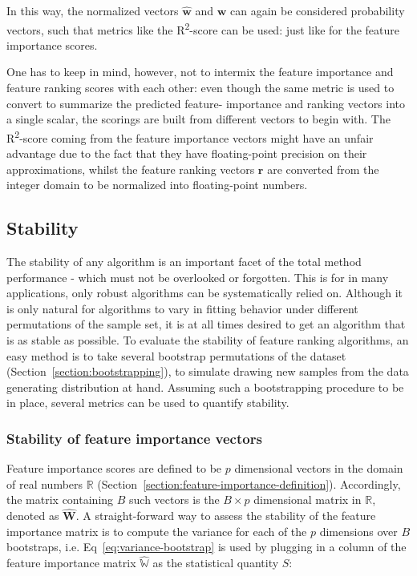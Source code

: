 \documentclass{article}
\begin{document}
In this way, the normalized vectors $\hat{\boldsymbol{w}}$ and $\boldsymbol{w}$ can again be considered probability vectors, such that metrics like the R\textsuperscript{2}-score can be used: just like for the feature importance scores.

One has to keep in mind, however, not to intermix the feature importance and feature ranking scores with each other: even though the same metric is used to convert to summarize the predicted feature- importance and ranking vectors into a single scalar, the scorings are built from different vectors to begin with. The R\textsuperscript{2}-score coming from the feature importance vectors might have an unfair advantage due to the fact that they have floating-point precision on their approximations, whilst the feature ranking vectors $\boldsymbol{r}$ are converted from the integer domain to be normalized into floating-point numbers.

\subsection{Stability}
The stability of any algorithm is an important facet of the total method performance - which must not be overlooked or forgotten. This is for in many applications, only robust algorithms can be systematically relied on. Although it is only natural for algorithms to vary in fitting behavior under different permutations of the sample set, it is at all times desired to get an algorithm that is as stable as possible. To evaluate the stability of feature ranking algorithms, an easy method is to take several bootstrap permutations of the dataset (Section~\ref{section:bootstrapping}), to simulate drawing new samples from the data generating distribution at hand. Assuming such a bootstrapping procedure to be in place, several metrics can be used to quantify stability.

\subsubsection{Stability of feature importance vectors}\label{section:feature-importance-stability}
Feature importance scores are defined to be $p$ dimensional vectors in the domain of real numbers $\mathbb{R}$ (Section~\ref{section:feature-importance-definition}). Accordingly, the matrix containing $B$ such vectors is the $B \times p$ dimensional matrix in $\mathbb{R}$, denoted as $\hat{\mathbf{W}}$. A straight-forward way to assess the stability of the feature importance matrix is to compute the variance for each of the $p$ dimensions over $B$ bootstraps, i.e. Eq~\ref{eq:variance-bootstrap} is used by plugging in a column of the feature importance matrix $\hat{\mathbb{W}}$ as the statistical quantity $S$:
\end{document}
